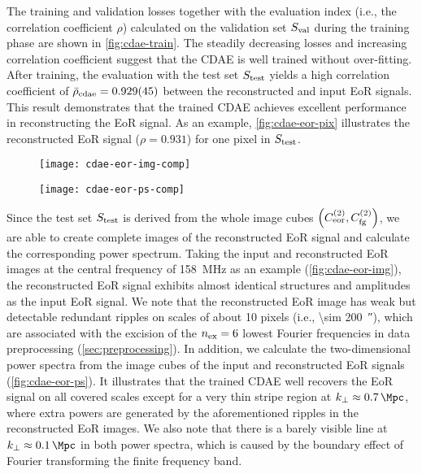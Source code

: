 The training and validation losses together with the evaluation index
(i.e., the correlation coefficient $\rho$) calculated on the validation set
$S_{\mathrm{val}}$ during the training phase are shown in \autoref{fig:cdae-train}.
The steadily decreasing losses and increasing correlation coefficient
suggest that the CDAE is well trained without over-fitting.
After training, the evaluation with the test set $S_{\mathrm{test}}$ yields a
high correlation coefficient of $\bar{\rho}_{\mathrm{cdae}} = \num{0.929 +- 0.045}$
between the reconstructed and input EoR signals.
This result demonstrates
that the trained CDAE achieves excellent performance in reconstructing the
EoR signal.
As an example, \autoref{fig:cdae-eor-pix} illustrates the reconstructed EoR
signal ($\rho = 0.931$) for one pixel in $S_{\mathrm{test}}$.

\begin{figure}[htp]
  \centering
  \texttt{[image: cdae-eor-img-comp]}
  \label{fig:cdae-eor-img}
\end{figure}

\begin{figure}[htp]
  \centering
  \texttt{[image: cdae-eor-ps-comp]}
  \label{fig:cdae-eor-ps}
\end{figure}

Since the test set $S_{\mathrm{test}}$ is derived from the whole image cubes
$\left( C_{\mathrm{eor}}^{(2)}, C_{\mathrm{fg}}^{(2)} \right)$, we are able to create
complete images of the reconstructed EoR signal and calculate the
corresponding power spectrum.
Taking the input and reconstructed EoR images at the central frequency of
\SI{158}{\MHz} as an example (\autoref{fig:cdae-eor-img}), the reconstructed EoR
signal exhibits almost identical structures and amplitudes as the input EoR
signal.
We note that the reconstructed EoR image has weak but detectable redundant
ripples on scales of about 10 pixels (i.e., \SI{\sim 200}{\arcsecond}),
which are associated with the excision of the $n_{\mathrm{ex}} = 6$ lowest
Fourier frequencies in data preprocessing (\autoref{sec:preprocessing}).
In addition, we calculate the two-dimensional power spectra from the image
cubes of the input and reconstructed EoR signals (\autoref{fig:cdae-eor-ps}).
It illustrates that the trained CDAE well recovers the EoR signal on all
covered scales except for a very thin stripe region at
$\kperp \approx \SI{0.7}{\per\Mpc}$, where extra powers are generated
by the aforementioned ripples in the reconstructed EoR images.
We also note that there is a barely visible line at
$\kperp \approx \SI{0.1}{\per\Mpc}$ in both power spectra, which is
caused by the boundary effect of Fourier transforming the finite frequency
band.

